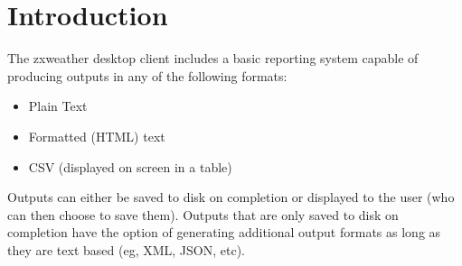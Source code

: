 \documentclass[a4paper,10pt]{book}
\newcommand{\partnumber}{\ifthenelse{\isundefined{\projectnum}}{}{\projectnum-\docnum	\ifthenelse{\equal{\docrev}{001}}{}{.\docrev}}}
\begin{document}

\ifthenelse{\isundefined{\ordernumber}}{

\title{\doctitle{} - \docsubtitle}
\author{\docauthor}
}{

\title{\doctitle}
\subtitle{\docsubtitle}
\titleabstract{\docabstract}
\ordernumber{\partnumber}
\updateinfo{\docupdateinfo}
\osinfo{\docosver}
\swversion{\docswver}
\titlecopyright{\doccopyright}
\licensestatement{\doclicense}
}
\date{\docdate}

\maketitle

\clearpage

\tableofcontents
\clearpage





\lstset{
  frame=single,
  numbers=left,
  basicstyle=\small,
  commentstyle=\emph
}



\chapter{Introduction}
\setcounter{page}{1}

The zxweather desktop client includes a basic reporting system capable of producing outputs in any of the following formats:
\begin{itemize}
\item Plain Text
\item Formatted (HTML) text
\item CSV (displayed on screen in a table)
\end{itemize}
Outputs can either be saved to disk on completion or displayed to the user (who can then choose to save them). Outputs that are only saved to disk on completion have the option of generating additional output formats as long as they are text based (eg, XML, JSON, etc).
\end{document}

